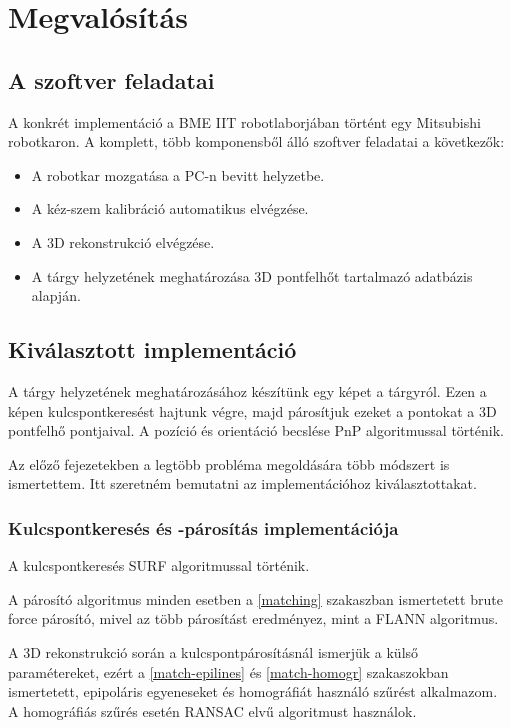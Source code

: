 
\chapter{Megvalósítás}
\section{A szoftver feladatai}
A konkrét implementáció a BME IIT robotlaborjában történt egy Mitsubishi robotkaron. A komplett, több komponensből álló szoftver feladatai a következők:

\begin{itemize}
\item A robotkar mozgatása a PC-n bevitt helyzetbe.
\item A kéz-szem kalibráció automatikus elvégzése.
\item A 3D rekonstrukció elvégzése.
\item A tárgy helyzetének meghatározása 3D pontfelhőt tartalmazó adatbázis alapján.
\end{itemize}	

\section{Kiválasztott implementáció}
A tárgy helyzetének meghatározásához készítünk egy képet a tárgyról. Ezen a képen kulcspontkeresést hajtunk végre, majd párosítjuk ezeket a pontokat a 3D pontfelhő pontjaival. A pozíció és orientáció becslése PnP algoritmussal történik.

Az előző fejezetekben a legtöbb probléma megoldására több módszert is ismertettem. Itt szeretném bemutatni az implementációhoz kiválasztottakat.

\subsection{Kulcspontkeresés és -párosítás implementációja}
A kulcspontkeresés SURF algoritmussal történik. 

A párosító algoritmus minden esetben a \ref{matching} szakaszban ismertetett brute force párosító, mivel az több párosítást eredményez, mint a FLANN algoritmus. 

A 3D rekonstrukció során a kulcspontpárosításnál ismerjük a külső paramétereket, ezért a \ref{match-epilines} és \ref{match-homogr} szakaszokban ismertetett, epipoláris egyeneseket és homográfiát használó szűrést alkalmazom. A homográfiás szűrés esetén RANSAC elvű algoritmust használok.

